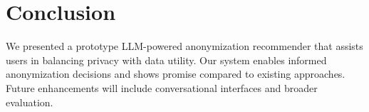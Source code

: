 \documentclass{article}
\begin{document}
\section{Conclusion}
We presented a prototype LLM-powered anonymization recommender that assists users in balancing privacy with data utility. Our system enables informed anonymization decisions and shows promise compared to existing approaches. Future enhancements will include conversational interfaces and broader evaluation.
\end{document}
